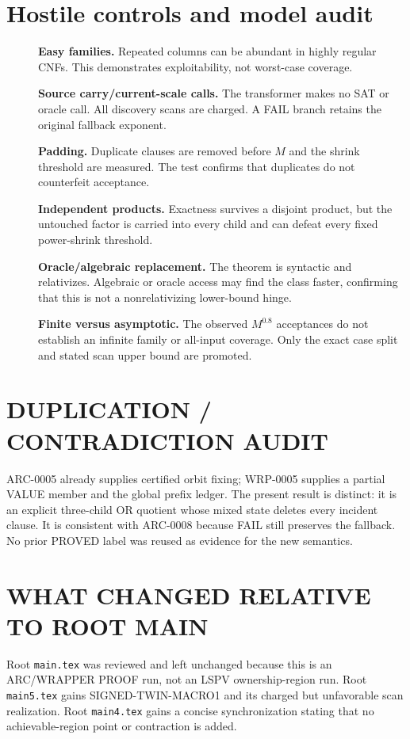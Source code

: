 \documentclass[11pt]{article}
\begin{document}
\section{Hostile controls and model audit}
\begin{description}
\item[] \textbf{Easy families.} Repeated columns can be abundant in highly
regular CNFs.  This demonstrates exploitability, not worst-case coverage.
\item[] \textbf{Source carry/current-scale calls.} The transformer makes no
SAT or oracle call.  All discovery scans are charged.  A FAIL branch retains
the original fallback exponent.
\item[] \textbf{Padding.} Duplicate clauses are removed before $M$ and the
shrink threshold are measured.  The test confirms that duplicates do not
counterfeit acceptance.
\item[] \textbf{Independent products.} Exactness survives a disjoint product,
but the untouched factor is carried into every child and can defeat every
fixed power-shrink threshold.
\item[] \textbf{Oracle/algebraic replacement.} The theorem is syntactic and
relativizes.  Algebraic or oracle access may find the class faster, confirming
that this is not a nonrelativizing lower-bound hinge.
\item[] \textbf{Finite versus asymptotic.} The observed $M^{0.8}$ acceptances
do not establish an infinite family or all-input coverage.  Only the exact
case split and stated scan upper bound are promoted.
\end{description}

\section{DUPLICATION / CONTRADICTION AUDIT}
ARC-0005 already supplies certified orbit fixing; WRP-0005 supplies a partial
VALUE member and the global prefix ledger.  The present result is distinct:
it is an explicit three-child OR quotient whose mixed state deletes every
incident clause.  It is consistent with ARC-0008 because FAIL still preserves
the fallback.  No prior PROVED label was reused as evidence for the new
semantics.

\section{WHAT CHANGED RELATIVE TO ROOT MAIN}
Root \texttt{main.tex} was reviewed and left unchanged because this is an
ARC/WRAPPER PROOF run, not an LSPV ownership-region run.  Root
\texttt{main5.tex} gains SIGNED-TWIN-MACRO1 and its charged but unfavorable
scan realization.  Root \texttt{main4.tex} gains a concise synchronization
stating that no achievable-region point or contraction is added.
\end{document}
